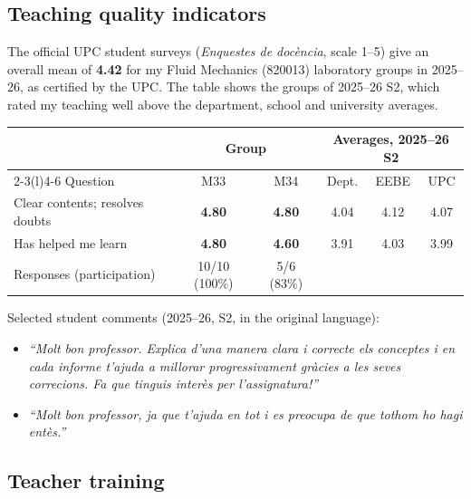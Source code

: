 \documentclass[11pt]{article}
\newcommand{\NEW}[1]{\iffinal #1\else{\color{red}#1}\fi} %
\begin{document}
\subsection{Teaching quality indicators}\label{sec:surveys}
The official UPC student surveys (\emph{Enquestes de doc\`encia}, scale 1--5) give an
overall mean of \textbf{4.42} for my Fluid Mechanics (820013) laboratory groups in
2025--26, as certified by the UPC. The table shows the groups of 2025--26 S2, which rated
my teaching well above the department, school and university averages.
\begin{center}\small
\begin{tabular}{@{}lccccc@{}}
\toprule
 & \multicolumn{2}{c}{Group} & \multicolumn{3}{c}{Averages, 2025--26 S2} \\
\cmidrule(lr){2-3}\cmidrule(l){4-6}
Question & M33 & M34 & Dept. & EEBE & UPC \\
\midrule
Clear contents; resolves doubts & \textbf{4.80} & \textbf{4.80} & 4.04 & 4.12 & 4.07 \\
Has helped me learn & \textbf{4.80} & \textbf{4.60} & 3.91 & 4.03 & 3.99 \\
\midrule
Responses (participation) & 10/10 (100\%) & 5/6 (83\%) & & & \\
\bottomrule
\end{tabular}
\end{center}
Selected student comments (2025--26, S2, in the original language):
\begin{itemize}
  \item \emph{``Molt bon professor. Explica d'una manera clara i correcte els conceptes i en
  cada informe t'ajuda a millorar progressivament gr\`acies a les seves correcions. Fa que
  tinguis inter\`es per l'assignatura!''}
  \item \emph{``Molt bon professor, ja que t'ajuda en tot i es preocupa de que tothom ho hagi
  ent\`es.''}
\end{itemize}

\subsection{\NEW{Teacher} training}\label{sec:training}
\end{document}
